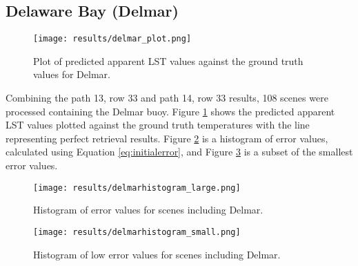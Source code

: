 \documentclass{book}
\begin{document}
\subsection{Delaware Bay (Delmar)}
\label{sec:delmarresults}

\begin{figure}[H]
\centering
\texttt{[image: results/delmar\_plot.png]}
\caption{Plot of predicted apparent LST values against the ground truth values for Delmar.}
\label{fig:delmar_plot}
\end{figure}

Combining the path 13, row 33 and path 14, row 33 results, 108 scenes were processed containing the Delmar buoy.  Figure \ref{fig:delmar_plot} shows the predicted apparent LST values plotted against the ground truth temperatures with the line representing perfect retrieval results.  Figure \ref{fig:delmarhistogram_large} is a histogram of error values, calculated using Equation \ref{eq:initialerror}, and Figure \ref{fig:delmarhistogram_small} is a subset of the smallest error values.  

\begin{figure}[H]
\centering
\texttt{[image: results/delmarhistogram\_large.png]}
\caption{Histogram of error values for scenes including Delmar.}
\label{fig:delmarhistogram_large}
\end{figure}

\begin{figure}[H]
\centering
\texttt{[image: results/delmarhistogram\_small.png]}
\caption{Histogram of low error values for scenes including Delmar.}
\label{fig:delmarhistogram_small}
\end{figure}
\end{document}
